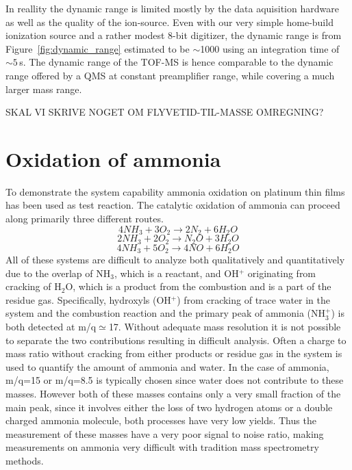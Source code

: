 \documentclass[aip,rsi]{revtex4-1}
\begin{document}
In reallity the dynamic range is limited mostly by the data aquisition hardware as well as the quality of the ion-source. Even with our very simple home-build ionization source and a rather modest 8-bit digitizer, the dynamic range is from Figure~\ref{fig:dynamic_range} estimated to be $\sim$1000 using an integration time of $\sim5\,$s. The dynamic range of the TOF-MS is hence comparable to the dynamic range offered by a QMS at constant preamplifier range, while covering a much larger mass range.

SKAL VI SKRIVE NOGET OM FLYVETID-TIL-MASSE OMREGNING?

\section{Oxidation of ammonia}
To demonstrate the system capability ammonia oxidation on platinum thin films has been used as test reaction. The catalytic oxidation of ammonia can proceed along primarily three different routes.
\begin{equation}
4NH_3+3O_2\rightarrow 2N_2 + 6H_2O
\label{eq:Pt_clean_combustion}
\end{equation}
\begin{equation}
2NH_3+2O_2\rightarrow N_2O + 3H_2O
\end{equation}
\begin{equation}
4NH_3+5O_2\rightarrow 4NO + 6H_2O
\end{equation}
All of these systems are difficult to analyze both qualitatively and quantitatively due to the overlap of NH$_3$, which is a reactant, and OH$^+$ originating from cracking of H$_2$O, which is a product from the combustion and is a part of the residue gas. Specifically, hydroxyls (OH$^{+}$) from cracking of trace water in the system and the combustion reaction and the primary peak of ammonia (NH$_{3}^{+}$) is both detected at m/q$\simeq$17. Without adequate mass resolution it is not possible to separate the two contributions resulting in difficult analysis. Often a charge to mass ratio without cracking from either products or residue gas in the system is used to quantify the amount of ammonia and water. In the case of ammonia, m/q=15 or m/q=8.5 is typically chosen since water does not contribute to these masses. However both of these masses contains only a very small fraction of the main peak, since it involves either the loss of two hydrogen atoms or a double charged ammonia molecule, both processes have very low yields. Thus the measurement of these masses have a very poor signal to noise ratio, making measurements on ammonia very difficult with tradition mass spectrometry methods.
\end{document}
